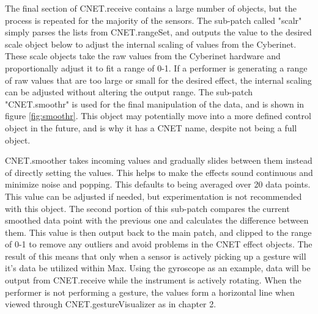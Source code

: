The final section of CNET.receive contains a large number of objects, but the process is repeated for the majority of the sensors. The sub-patch called "scalr" simply parses the lists from CNET.rangeSet, and outputs the value to the desired scale object below to adjust the internal scaling of values from the Cyberinet. These scale objects take the raw values from the Cyberinet hardware and proportionally adjust it to fit a range of 0-1. If a performer is generating a range of raw values that are too large or small for the desired effect, the internal scaling can be adjusted without altering the output range. The sub-patch "CNET.smoothr" is used for the final manipulation of the data, and is shown in figure \ref{fig:smoothr}. This object may potentially move into a more defined control object in the future, and is why it has a CNET name, despite not being a full object.

CNET.smoother takes incoming values and gradually slides between them instead of directly setting the values. This helps to make the effects sound continuous and minimize noise and popping. This defaults to being averaged over 20 data points. This value can be adjusted if needed, but experimentation is not recommended with this object. The second portion of this sub-patch compares the current smoothed data point with the previous one and calculates the difference between them. This value is then output back to the main patch, and clipped to the range of 0-1 to remove any outliers and avoid problems in the CNET effect objects. The result of this means that only when a sensor is actively picking up a gesture will it's data be utilized within Max. Using the gyroscope as an example, data will be output from CNET.receive while the instrument is actively rotating. When the performer is not performing a gesture, the values form a horizontal line when viewed through CNET.gestureVisualizer as in chapter 2.

